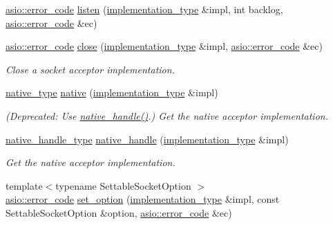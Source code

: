 \begin{DoxyCompactItemize}
\hyperlink{classasio_1_1error__code}{asio\+::error\+\_\+code} \hyperlink{classasio_1_1socket__acceptor__service_a343dbdb79d603e81b821c27ffff5518b}{listen} (\hyperlink{classasio_1_1socket__acceptor__service_ae91b355a38c59424f68df71fcd9fffb8}{implementation\+\_\+type} \&impl, int backlog, \hyperlink{classasio_1_1error__code}{asio\+::error\+\_\+code} \&ec)
\item 
\hyperlink{classasio_1_1error__code}{asio\+::error\+\_\+code} \hyperlink{classasio_1_1socket__acceptor__service_a7cd21d9c2d9a465207f3ea79056c3ca7}{close} (\hyperlink{classasio_1_1socket__acceptor__service_ae91b355a38c59424f68df71fcd9fffb8}{implementation\+\_\+type} \&impl, \hyperlink{classasio_1_1error__code}{asio\+::error\+\_\+code} \&ec)
\begin{DoxyCompactList}\small\item\em Close a socket acceptor implementation. \end{DoxyCompactList}\item 
\hyperlink{classasio_1_1socket__acceptor__service_a26cf6dae27417c057eca8c60a65950ed}{native\+\_\+type} \hyperlink{classasio_1_1socket__acceptor__service_abc227683740cdb6e3017641dba236fac}{native} (\hyperlink{classasio_1_1socket__acceptor__service_ae91b355a38c59424f68df71fcd9fffb8}{implementation\+\_\+type} \&impl)
\begin{DoxyCompactList}\small\item\em (Deprecated\+: Use \hyperlink{classasio_1_1socket__acceptor__service_a328de9eeff0180706b8dced3b7893afd}{native\+\_\+handle()}.) Get the native acceptor implementation. \end{DoxyCompactList}\item 
\hyperlink{classasio_1_1socket__acceptor__service_a48826fea49fd08ba8d3ee51697f1a092}{native\+\_\+handle\+\_\+type} \hyperlink{classasio_1_1socket__acceptor__service_a328de9eeff0180706b8dced3b7893afd}{native\+\_\+handle} (\hyperlink{classasio_1_1socket__acceptor__service_ae91b355a38c59424f68df71fcd9fffb8}{implementation\+\_\+type} \&impl)
\begin{DoxyCompactList}\small\item\em Get the native acceptor implementation. \end{DoxyCompactList}\item 
{\footnotesize template$<$typename Settable\+Socket\+Option $>$ }\\\hyperlink{classasio_1_1error__code}{asio\+::error\+\_\+code} \hyperlink{classasio_1_1socket__acceptor__service_a4b2f07815e07ca17bbc88a6fb6b49383}{set\+\_\+option} (\hyperlink{classasio_1_1socket__acceptor__service_ae91b355a38c59424f68df71fcd9fffb8}{implementation\+\_\+type} \&impl, const Settable\+Socket\+Option \&option, \hyperlink{classasio_1_1error__code}{asio\+::error\+\_\+code} \&ec)

\end{DoxyCompactItemize}
